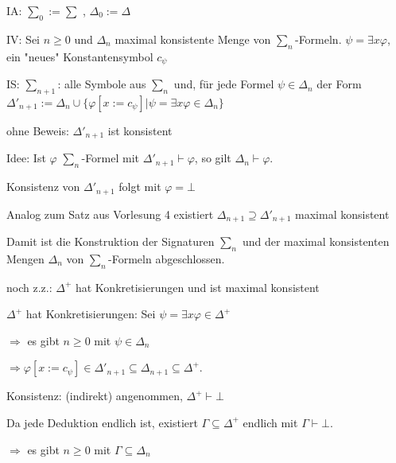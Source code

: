 \documentclass[a4paper]{article}
\begin{document}
\begin{multicols}{3}
  \begin{enumerate*}
    \item IA: $\sum_0 := \sum$ , $\Delta_0:=\Delta$
    \item IV: Sei $n\geq 0$ und $\Delta_n$ maximal konsistente Menge von $\sum_n$-Formeln. $\psi=\exists x\varphi$, ein "neues" Konstantensymbol $c_{\psi}$
    \item IS: $\sum_{n+1}$: alle Symbole aus $\sum_n$ und, für jede Formel $\psi\in\Delta_n$ der Form $\Delta'_{n+1}:= \Delta_n\cup\{\varphi[x:=c_{\psi}]|\psi=\exists x\varphi\in\Delta_n\}$
    \begin{itemize*}
      \item ohne Beweis: $\Delta'_{n+1}$ ist konsistent
      \item Idee: Ist $\varphi$ $\sum_n$-Formel mit $\Delta'_{n+1}\vdash\varphi$, so gilt $\Delta_n\vdash\varphi$.
      \item Konsistenz von $\Delta'_{n+1}$ folgt mit $\varphi=\bot$
      \item Analog zum Satz aus Vorlesung 4 existiert $\Delta_{n+1}\supseteq \Delta'_{n+1}$ maximal konsistent
    \end{itemize*}
    \begin{itemize*}
      \item Damit ist die Konstruktion der Signaturen $\sum_n$ und der maximal konsistenten Mengen $\Delta_n$  von $\sum_n$-Formeln abgeschlossen.
      \item noch z.z.: $\Delta^+$ hat Konkretisierungen und ist maximal konsistent
      \begin{itemize*}
        \item $\Delta^+$ hat Konkretisierungen: Sei $\psi=\exists x\varphi\in\Delta^+$
        \begin{itemize*}
          \item $\Rightarrow$ es gibt $n\geq 0$ mit $\psi\in\Delta_n$
          \item $\Rightarrow \varphi[x:=c_{\psi}]\in\Delta'_{n+1}\subseteq \Delta_{n+1}\subseteq\Delta^+$.
        \end{itemize*}
        \item Konsistenz: (indirekt) angenommen, $\Delta^+\vdash\bot$
        \begin{itemize*}
          \item Da jede Deduktion endlich ist, existiert $\Gamma\subseteq\Delta^+$ endlich mit $\Gamma\vdash\bot$.
          \item $\Rightarrow$ es gibt $n\geq 0$ mit $\Gamma\subseteq\Delta_n$

\end{itemize*}
\end{itemize*}
\end{itemize*}
\end{enumerate*}
\end{multicols}
\end{document}
